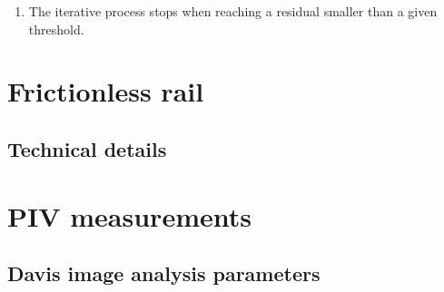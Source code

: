 \begin{enumerate}
		\begin{enumerate}[label=\alph*)]
			\item Transform every experimental point from the Cartesian coordinates system  $M(x,y)$ to the polar coordinates system $M'(R,\theta)$  as follow:
				\begin{align*}
				R_{exp}(\theta)_i &=\sqrt{(x_i- x_c)^2+(y_i-y_c)^2}  \\
				\theta_{exp_i} &= \arctan(\frac{y_i-y_c}{x_i- x_c}) \\
				\end{align*}
				Where $x_c$ and $y_c$ are fitting parameters corresponding to the center of the polar coordinates, initialized by $M_{c0} (x_{c0},y_{c0})$.
			\item Evaluate the fitting parametric curve:
				\begin{align*}
					\tilde{R}(\theta)_i &=\sum\limits_{k=0}^M a_k \sin(\theta_{exp_i}-\theta_0)^k  \\
				\end{align*}
				for the fitting parameters $\theta_0$\footnote{$\theta_0$ represents the angle formed bet ween the symmetry axis of the experimental points and the y-axis.} 			 and $a_k$ coefficients, with $k={0,...,M}$, $M$ being the degree of the polynomial.
			\item Measure the distance $R_{exp}(\theta)_i-\tilde{R}_(\theta)_i$ and iterate.
		\end{enumerate}
	The minimization is done using $"`Levenberg-Marquardt"'$ method, commonly known as $"`least-squares"'$ minimization method.
	\item The iterative process stops when reaching a residual smaller than a given threshold.	
\end{enumerate}
\section{Frictionless rail}
\subsection{Technical details}

\section{PIV measurements}
\subsection{Davis image analysis parameters}

